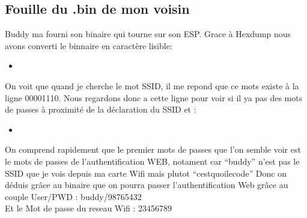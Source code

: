 \documentclass[10pt,a4paper]{article}
\newcommand{\insertcode}[2]{\begin{itemize}\item[]\end{itemize}}
\begin{document}
\subsection{Fouille du .bin de mon voisin}
Buddy ma fourni son binaire qui tourne sur son ESP. Grace à Hexdump nous avons converti le binnaire en caractère lisible:
\insertcode{code/hexcom.txt}{traduction}

 On voit que quand je cherche le mot SSID, il me repond que ce mots existe à la ligne 00001110. Nous regardons donc a cette ligne pour voir si il ya pas des mots de passes à proximité de la déclaration du SSID et :
 \insertcode{code/result.hex}{On a trouvé !}
 On comprend rapidement que le premier mots de passes que l'on semble voir est le mots de passes de l'authentification WEB, notament car ``buddy'' n'est pas le SSID que je vois depuis ma carte Wifi mais plutot ``cestquoilecode''
 Donc on déduis grâce au binaire que on pourra passer l'authentification Web grâce au couple User/PWD : buddy/98765432\\
 Et le Mot de passe du reseau Wifi : 23456789
 
 
\end{document}
